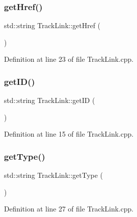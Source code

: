 \mbox{\label{class_track_link_a10db68bd5613d2f6a2c6c30006cd55fe}} 
\subsubsection{\texorpdfstring{get\+Href()}{getHref()}}
{\footnotesize\ttfamily std\+::string Track\+Link\+::get\+Href (\begin{DoxyParamCaption}{ }\end{DoxyParamCaption})}



Definition at line 23 of file Track\+Link.\+cpp.

\mbox{\label{class_track_link_afb6168a88cf533689f46f77648e870c9}} 
\subsubsection{\texorpdfstring{get\+I\+D()}{getID()}}
{\footnotesize\ttfamily std\+::string Track\+Link\+::get\+ID (\begin{DoxyParamCaption}{ }\end{DoxyParamCaption})}



Definition at line 15 of file Track\+Link.\+cpp.

\mbox{\label{class_track_link_aa0d629e97bf8d6ebf492f575fd9f7108}} 
\subsubsection{\texorpdfstring{get\+Type()}{getType()}}
{\footnotesize\ttfamily std\+::string Track\+Link\+::get\+Type (\begin{DoxyParamCaption}{ }\end{DoxyParamCaption})}



Definition at line 27 of file Track\+Link.\+cpp.

\mbox{\label{class_track_link_a81f25509c8a6f0565e9183aeac92f802}} 
